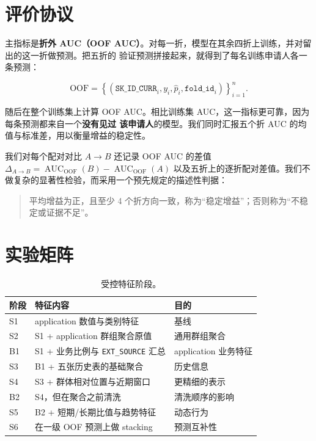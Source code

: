 \documentclass[11pt,UTF8,fontset=windows]{ctexrep}
\begin{document}
\section{评价协议}

主指标是\textbf{折外 AUC（OOF AUC）}。对每一折，模型在其余四折上训练，并对留出的这一折做预测。把五折的
验证预测拼接起来，就得到了每名训练申请人各一条预测：

\[
\text{OOF} =
\left\{
(\texttt{SK\_ID\_CURR}_i, y_i, \hat p_i, \texttt{fold\_id}_i)
\right\}_{i=1}^{n}.
\]

随后在整个训练集上计算 OOF AUC。相比训练集 AUC，这一指标更可靠，因为每条预测都来自一个\textbf{没有见过
该申请人}的模型。我们同时汇报五个折 AUC 的均值与标准差，用以衡量增益的稳定性。

我们对每个配对对比 $A\to B$ 还记录 OOF AUC 的差值
\(
\Delta_{A\to B}=\operatorname{AUC}_{\mathrm{OOF}}(B)-\operatorname{AUC}_{\mathrm{OOF}}(A)
\)
以及五折上的逐折配对差值。我们不做复杂的显著性检验，而采用一个预先规定的描述性判据：

\begin{quote}
平均增益为正，且至少 4 个折方向一致，称为“稳定增益”；否则称为“不稳定或证据不足”。
\end{quote}

\section{实验矩阵}

\begin{table}[h]
\centering
\caption{受控特征阶段。}
\label{tab:matrix}
\begin{tabular}{lll}
\toprule
阶段 & 特征内容 & 目的 \\
\midrule
S1 & application 数值与类别特征 & 基线 \\
S2 & S1 + application 群组聚合原值 & 通用群组聚合 \\
B1 & S1 + 业务比例与 \texttt{EXT\_SOURCE} 汇总 & application 业务特征 \\
S3 & B1 + 五张历史表的基础聚合 & 历史信息 \\
S4 & S3 + 群体相对位置与近期窗口 & 更精细的表示 \\
B2 & S4，但在聚合之前清洗 & 清洗顺序的影响 \\
S5 & B2 + 短期/长期比值与趋势特征 & 动态行为 \\
S6 & 在一级 OOF 预测上做 stacking & 预测互补性 \\
\bottomrule
\end{tabular}
\end{table}
\end{document}
